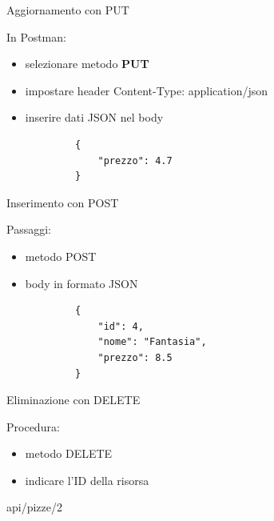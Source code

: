 \documentclass{beamer}
\begin{document}
	
	\begin{frame}[fragile]{Aggiornamento con PUT}
		
		In Postman:
		
		\begin{itemize}
			\item selezionare metodo \textbf{PUT}
			\item impostare header Content-Type: application/json
			\item inserire dati JSON nel body
		\end{itemize}
		
		\begin{lstlisting}
			{
				"prezzo": 4.7
			}
		\end{lstlisting}
		
	\end{frame}
	
	
	\begin{frame}[fragile]{Inserimento con POST}
		
		Passaggi:
		
		\begin{itemize}
			\item metodo POST
			\item body in formato JSON
		\end{itemize}
		
		\begin{lstlisting}
			{
				"id": 4,
				"nome": "Fantasia",
				"prezzo": 8.5
			}
		\end{lstlisting}
		
	\end{frame}
	
	
	\begin{frame}{Eliminazione con DELETE}
		
		Procedura:
		
		\begin{itemize}
			\item metodo DELETE
			\item indicare l'ID della risorsa
		\end{itemize}
		
		\begin{center}
			api/pizze/2
		\end{center}
		
	\end{frame}
	
\end{document}
